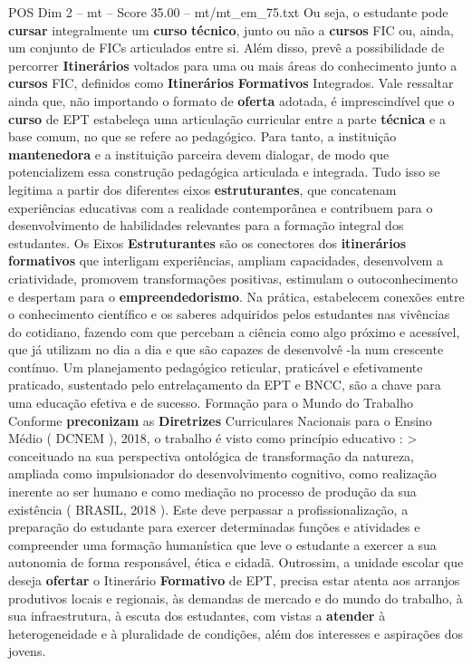 \begin{textsample}{POS Dim 2 – mt – Score 35.00 – mt/mt\_em\_75.txt}
Ou seja, o estudante pode \textbf{cursar} integralmente um \textbf{curso} \textbf{técnico}, junto ou não a \textbf{cursos} FIC ou, ainda, um conjunto de FICs articulados entre si.
Além disso, prevê a possibilidade de percorrer \textbf{Itinerários} voltados para uma ou mais áreas do conhecimento junto a \textbf{cursos} FIC, definidos como \textbf{Itinerários} \textbf{Formativos} Integrados.
Vale ressaltar ainda que, não importando o formato de \textbf{oferta} adotada, é imprescindível que o \textbf{curso} de EPT estabeleça uma articulação curricular entre a parte \textbf{técnica} e a base comum, no que se refere ao pedagógico.
Para tanto, a instituição \textbf{mantenedora} e a instituição parceira devem dialogar, de modo que potencializem essa construção pedagógica articulada e integrada.
Tudo isso se legitima a partir dos diferentes eixos \textbf{estruturantes}, que concatenam experiências educativas com a realidade contemporânea e contribuem para o desenvolvimento de habilidades relevantes para a formação integral dos estudantes.
Os Eixos \textbf{Estruturantes} são os conectores dos \textbf{itinerários} \textbf{formativos} que interligam experiências, ampliam capacidades, desenvolvem a criatividade, promovem transformações positivas, estimulam o outoconhecimento e despertam para o \textbf{empreendedorismo}.
Na prática, estabelecem conexões entre o conhecimento científico e os saberes adquiridos pelos estudantes nas vivências do cotidiano, fazendo com que percebam a ciência como algo próximo e acessível, que já utilizam no dia a dia e que são capazes de desenvolvê -la num crescente contínuo.
Um planejamento pedagógico reticular, praticável e efetivamente praticado, sustentado pelo entrelaçamento da EPT e BNCC, são a chave para uma educação efetiva e de sucesso.
Formação para o Mundo do Trabalho Conforme \textbf{preconizam} as \textbf{Diretrizes} Curriculares Nacionais para o Ensino Médio ( DCNEM ), 2018, o trabalho é visto como princípio educativo : > conceituado na sua perspectiva ontológica de transformação da natureza, ampliada como impulsionador do desenvolvimento cognitivo, como realização inerente ao ser humano e como mediação no processo de produção da sua existência ( BRASIL, 2018 ).
Este deve perpassar a profissionalização, a preparação do estudante para exercer determinadas funções e atividades e compreender uma formação humanística que leve o estudante a exercer a sua autonomia de forma responsável, ética e cidadã.
Outrossim, a unidade escolar que deseja \textbf{ofertar} o Itinerário \textbf{Formativo} de EPT, precisa estar atenta aos arranjos produtivos locais e regionais, às demandas de mercado e do mundo do trabalho, à sua infraestrutura, à escuta dos estudantes, com vistas a \textbf{atender} à heterogeneidade e à pluralidade de condições, além dos interesses e aspirações dos jovens.

\end{textsample}
